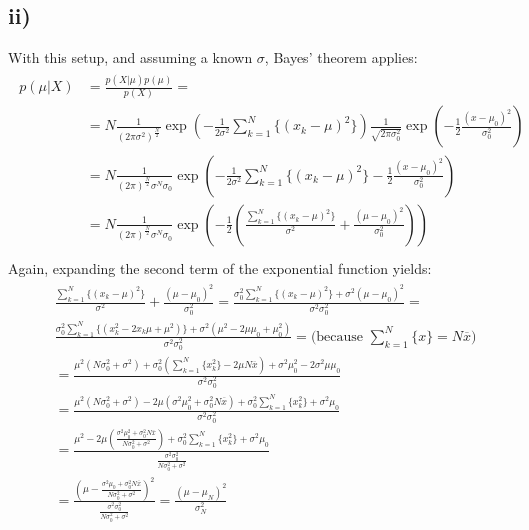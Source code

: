 \documentclass[11pt]{scrartcl} %
\begin{document}
         \subsection*{ii)}
         With this setup, and assuming a known \(\sigma\), Bayes' theorem applies:
         \begin{align*}
           \begin{split}
             p(\mu|X) &= \frac{p(X|\mu)p(\mu)}{p(X)} =\\
             &= N \frac{1}{(2\pi\sigma^2)^{\frac{N}{2}}}\exp\left(-\frac{1}{2\sigma^2}\sum_{k=1}^N\{(x_k-\mu)^2\}\right) \frac{1}{\sqrt{2\pi\sigma_0^2}} \exp\left(-\frac{1}{2}\frac{(x-\mu_0)^2}{\sigma_0^2} \right)\\
             &= N \frac{1}{(2\pi)^{\frac{N}{2}}\sigma^N\sigma_0}\exp\left(-\frac{1}{2\sigma^2}\sum_{k=1}^N\{(x_k-\mu)^2\}-\frac{1}{2}\frac{(x-\mu_0)^2}{\sigma_0^2} \right)\\
             &= N \frac{1}{(2\pi)^{\frac{N}{2}}\sigma^N\sigma_0}\exp\left(-\frac{1}{2}\left(\frac{\sum_{k=1}^N\{(x_k-\mu)^2\}}{\sigma^2}+\frac{(\mu-\mu_0)^2}{\sigma_0^2}\right)\right)\\
           \end{split}
         \end{align*}
         Again, expanding the second term of the exponential function yields:
         \begin{align*}
           \begin{split}
             &\frac{\sum_{k=1}^N\{(x_k-\mu)^2\}}{\sigma^2}+\frac{(\mu-\mu_0)^2}{\sigma_0^2}= \frac{\sigma_0^2\sum_{k=1}^N\{(x_k-\mu)^2\} + \sigma^2(\mu-\mu_0)^2}{\sigma^2\sigma_0^2} = \\
             &\frac{\sigma_0^2\sum_{k=1}^N\{(x_k^2-2x_k\mu+\mu^2)\} + \sigma^2(\mu^2-2\mu\mu_0+\mu_0^2)}{\sigma^2\sigma_0^2} = \text{(because }\sum_{k=1}^N\{x\}=N\overline{x})\\
             &= \frac{\mu^2(N\sigma_0^2+\sigma^2)+\sigma_0^2(\sum_{k=1}^N\{x_k^2\}-2\mu N\overline{x})+\sigma^2\mu_0^2-2\sigma^2\mu\mu_0}{\sigma^2\sigma_0^2}\\
             &= \frac{\mu^2(N\sigma_0^2+\sigma^2) -2\mu(\sigma^2\mu_0^2+\sigma_0^2N\overline{x})+\sigma_0^2\sum_{k=1}^N\{x_k^2\}+\sigma^2\mu_0}{\sigma^2\sigma_0^2}\\
             &= \frac{\mu^2 -2\mu(\frac{\sigma^2\mu_0^2+\sigma_0^2N\overline{x}}{N\sigma_0^2+\sigma^2})+\sigma_0^2\sum_{k=1}^N\{x_k^2\}+\sigma^2\mu_0}{\frac{\sigma^2\sigma_0^2}{N\sigma_0^2+\sigma^2}}\\
             &= \frac{(\mu -\frac{\sigma^2\mu_0+\sigma_0^2N\overline{x}}{N\sigma_0^2+\sigma^2})^2}{\frac{\sigma^2\sigma_0^2}{N\sigma_0^2+\sigma^2}} = \frac{(\mu-\mu_N)^2}{\sigma_N^2}\\
           \end{split}
         \end{align*}
         
\end{document}
